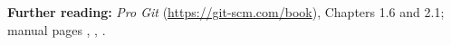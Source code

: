 \textbf{Further reading:} \emph{Pro Git} (\url{https://git-scm.com/book}), Chapters 1.6 and 2.1; manual pages , , .

\solutionspage




